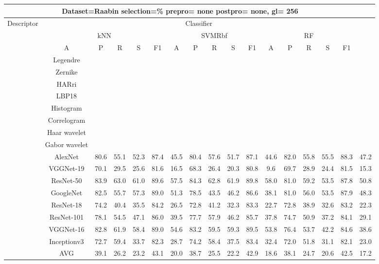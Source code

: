\documentclass[12pt,italian]{article}
\begin{document}
\begin{tiny}
 \pagebreak 
\begin{longtable}{lcccccccccccccccc}
\toprule
\multicolumn{16}{c}{Dataset=Raabin selection=\% prepro= none postpro= none, gl= 256} \\ 
\toprule
Descriptor & \multicolumn{15}{c}{Classifier} \\ 
& \multicolumn{5}{c}{kNN} & \multicolumn{5}{c}{SVMRbf} & \multicolumn{5}{c}{RF} \\ 
& A & P & R & S & F1 & A & P & R & S & F1 & A & P & R & S & F1 \\ 
\midrule
& Legendre \\ 
& Zernike \\ 
& HARri \\ 
& LBP18 \\ 
& Histogram \\ 
& Correlogram \\ 
& Haar wavelet \\ 
& Gabor wavelet \\ 
& AlexNet & 80.6 & 55.1 & 52.3 & 87.4 & 45.5 & 80.4 & 57.6 & 51.7 & 87.1 & 44.6 & 82.0 & 55.8 & 55.5 & 88.3 & 47.2 \\ 
& VGGNet-19 & 70.1 & 29.5 & 25.6 & 81.6 & 16.5 & 68.3 & 26.4 & 20.3 & 80.8 &  9.6 & 69.7 & 28.9 & 24.4 & 81.5 & 15.3 \\ 
& ResNet-50 & 83.9 & 63.0 & 61.0 & 89.6 & 57.5 & 84.3 & 62.8 & 61.9 & 89.8 & 58.0 & 81.0 & 59.2 & 53.5 & 87.8 & 50.8 \\ 
& GoogleNet & 82.5 & 55.7 & 57.3 & 89.0 & 51.3 & 78.5 & 43.5 & 46.2 & 86.6 & 38.1 & 81.0 & 56.0 & 53.5 & 87.9 & 48.3 \\ 
& ResNet-18 & 74.2 & 40.4 & 35.5 & 84.2 & 26.5 & 72.8 & 41.2 & 32.3 & 83.3 & 22.7 & 72.8 & 38.9 & 32.6 & 83.2 & 22.3 \\ 
& ResNet-101 & 78.1 & 54.5 & 47.1 & 86.0 & 39.5 & 77.7 & 57.9 & 46.2 & 85.7 & 37.8 & 74.7 & 50.9 & 37.2 & 84.1 & 29.1 \\ 
& VGGNet-16 & 82.8 & 61.9 & 58.4 & 89.0 & 54.6 & 83.2 & 59.5 & 59.3 & 89.5 & 53.8 & 76.4 & 53.7 & 42.2 & 84.6 & 38.6 \\ 
& Inceptionv3 & 72.7 & 59.4 & 33.7 & 82.3 & 28.7 & 74.2 & 58.4 & 37.5 & 83.4 & 32.4 & 72.0 & 51.8 & 31.1 & 82.1 & 23.0 \\ 
\hline
& AVG & 39.1 & 26.2 & 23.2 & 43.1 & 20.0 & 38.7 & 25.5 & 22.2 & 42.9 & 18.6 & 38.1 & 24.7 & 20.6 & 42.5 & 17.2 \\ 
\hline
\bottomrule
\end{longtable} 

 \pagebreak 
\end{tiny} 
 
\end{document}
